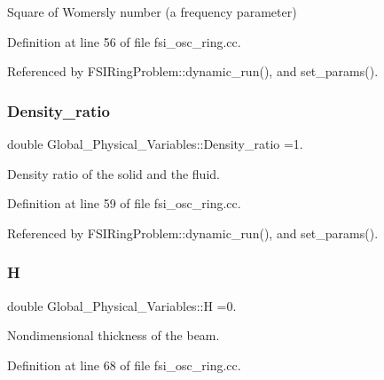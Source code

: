 Square of Womersly number (a frequency parameter) 



Definition at line 56 of file fsi\+\_\+osc\+\_\+ring.\+cc.



Referenced by F\+S\+I\+Ring\+Problem\+::dynamic\+\_\+run(), and set\+\_\+params().

\mbox{\label{namespaceGlobal__Physical__Variables_af5163137c5b98c6ebb942973cba4e297}} 
\subsubsection{\texorpdfstring{Density\+\_\+ratio}{Density\_ratio}}
{\footnotesize\ttfamily double Global\+\_\+\+Physical\+\_\+\+Variables\+::\+Density\+\_\+ratio =1.}



Density ratio of the solid and the fluid. 



Definition at line 59 of file fsi\+\_\+osc\+\_\+ring.\+cc.



Referenced by F\+S\+I\+Ring\+Problem\+::dynamic\+\_\+run(), and set\+\_\+params().

\mbox{\label{namespaceGlobal__Physical__Variables_af6e07423e22c0991084d9a2f43727805}} 
\subsubsection{\texorpdfstring{H}{H}}
{\footnotesize\ttfamily double Global\+\_\+\+Physical\+\_\+\+Variables\+::H =0.}



Nondimensional thickness of the beam. 



Definition at line 68 of file fsi\+\_\+osc\+\_\+ring.\+cc.



